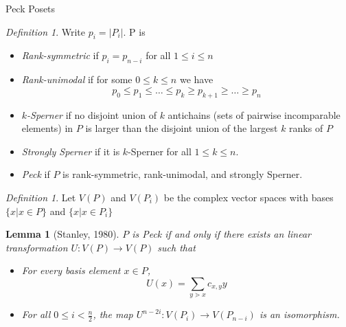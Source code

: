 \documentclass{beamer}
\newtheorem{lem}[thm]{Lemma}
\theoremstyle{remark}
\newtheorem{defn}[thm]{Definition}
\begin{document}
\begin{frame}{Peck Posets}
\begin{defn}
Write $p_i = |P_i|$.  P is
\begin{itemize}

\item \textit{Rank-symmetric} if $p_i = p_{n-i}$ for all $1\le i\le n$

\item \textit{Rank-unimodal} if for some $0\le k\le n$ we have
$$p_0\le p_1\le \ldots \le p_k \ge p_{k+1} \ge\ldots \ge p_n$$

\item \textit{$k$-Sperner} if no disjoint union of $k$ antichains (sets of pairwise incomparable elements) in $P$ is larger than the disjoint union of the largest $k$ ranks of $P$

\item \textit{Strongly Sperner} if it is $k$-Sperner for all $1\le k\le n$.

\item \textit{Peck} if $P$ is rank-symmetric, rank-unimodal, and strongly Sperner.
\end{itemize}
\end{defn}
\end{frame}







\begin{frame}

\begin{defn}
Let $V(P)$ and $V(P_i)$ be the complex vector spaces with bases $\{x |x\in P\}$ and $\{x |x\in P_i\}$
\end{defn}

\begin{lem}[Stanley, 1980]
$P$ is Peck if and only if there exists an linear transformation $U\colon V(P)\rightarrow V(P)$ such that
\begin{itemize}
\item For every basis element $x\in P$, 
$$U(x) = \sum_{y\gtrdot x} c_{x,y}y$$

\item  For all $0\le i < \frac{n}{2}$, the map $U^{n-2i}\colon V(P_i)\rightarrow V(P_{n-i})$ is an isomorphism.
\end{itemize}
\end{lem}
\end{frame}
\end{document}
